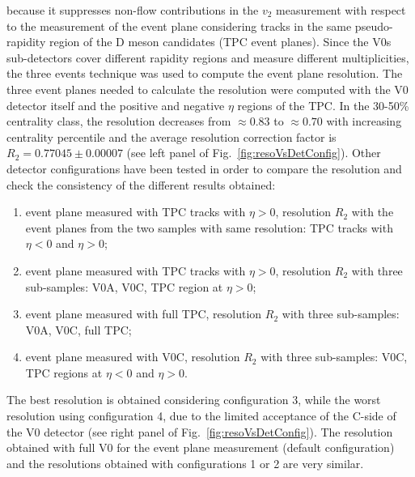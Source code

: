 because it suppresses non-flow contributions in the $v_2$ measurement with respect
to the measurement of the event plane considering tracks in the same
pseudo-rapidity region of the D meson candidates (TPC event planes).
Since the V0s sub-detectors cover different rapidity 
regions and measure different multiplicities, the
three events technique was used to compute the event plane resolution.
The three event planes needed to calculate the resolution were computed with the V0 detector itself and the 
positive and negative $\eta$ regions of the TPC.
In the 30-50\% centrality class, the resolution decreases from $\approx 0.83$ to $\approx 0.70$ with increasing centrality
percentile and the average resolution correction factor is
$R_2 = 0.77045 \pm 0.00007$ (see left panel 
of Fig.~\ref{fig:resoVsDetConfig}). 
Other detector 
configurations have been tested in order to compare 
the resolution and check the consistency of the different 
results obtained:
\begin{enumerate}
\item event plane measured with TPC tracks with $\eta > 0$,  
resolution $R_2$ with the event planes from the two samples with same resolution: 
TPC tracks with $\eta < 0$ and $\eta > 0$;
\item event plane measured with TPC tracks with $\eta > 0$,  
resolution $R_2$ with three sub-samples: V0A, V0C, TPC region at $\eta > 0$; 
\item event plane measured with full TPC,  
resolution $R_2$ with three sub-samples: V0A, V0C, full TPC; 
\item event plane measured with V0C,  
resolution $R_2$ with three sub-samples:  V0C, TPC regions at $\eta < 0$ and $\eta > 0$.
\end{enumerate}
The best resolution is obtained considering configuration 3, 
while the worst resolution using configuration 4, due to
the limited acceptance of the C-side of the V0 detector (see right panel 
of Fig.~\ref{fig:resoVsDetConfig}). 
The resolution obtained with full V0 for the event
plane measurement (default configuration) and the 
resolutions obtained with configurations 1 or 2 are very similar. 
\\

